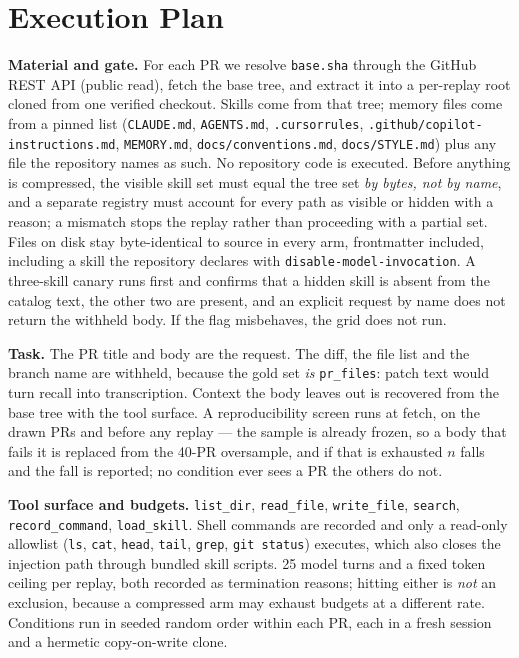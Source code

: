 \documentclass[10pt,conference]{IEEEtran}
\begin{document}
\section{Execution Plan}
\label{sec:exec}
\textbf{Material and gate.} For each PR we resolve \texttt{base.sha} through the GitHub REST API (public read), fetch the base tree, and extract it into a per-replay root cloned from one verified checkout. Skills come from that tree; memory files come from a pinned list (\texttt{CLAUDE.md}, \texttt{AGENTS.md}, \texttt{.cursorrules}, \texttt{.github/copilot-instructions.md}, \texttt{MEMORY.md}, \texttt{docs/conventions.md}, \texttt{docs/STYLE.md}) plus any file the repository names as such. No repository code is executed. Before anything is compressed, the visible skill set must equal the tree set \emph{by bytes, not by name}, and a separate registry must account for every path as visible or hidden with a reason; a mismatch stops the replay rather than proceeding with a partial set. Files on disk stay byte-identical to source in every arm, frontmatter included, including a skill the repository declares with \texttt{disable-model-invocation}. A three-skill canary runs first and confirms that a hidden skill is absent from the catalog text, the other two are present, and an explicit request by name does not return the withheld body. If the flag misbehaves, the grid does not run.

\textbf{Task.} The PR title and body are the request. The diff, the file list and the branch name are withheld, because the gold set \emph{is} \texttt{pr\_files}: patch text would turn recall into transcription. Context the body leaves out is recovered from the base tree with the tool surface. A reproducibility screen runs at fetch, on the drawn PRs and before any replay --- the sample is already frozen, so a body that fails it is replaced from the 40-PR oversample, and if that is exhausted $n$ falls and the fall is reported; no condition ever sees a PR the others do not.

\textbf{Tool surface and budgets.} \texttt{list\_dir}, \texttt{read\_file}, \texttt{write\_file}, \texttt{search}, \texttt{record\_command}, \texttt{load\_skill}. Shell commands are recorded and only a read-only allowlist (\texttt{ls}, \texttt{cat}, \texttt{head}, \texttt{tail}, \texttt{grep}, \texttt{git status}) executes, which also closes the injection path through bundled skill scripts. 25 model turns and a fixed token ceiling per replay, both recorded as termination reasons; hitting either is \emph{not} an exclusion, because a compressed arm may exhaust budgets at a different rate. Conditions run in seeded random order within each PR, each in a fresh session and a hermetic copy-on-write clone.
\end{document}
